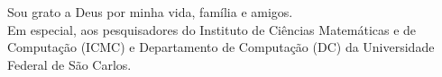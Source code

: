 Sou grato a Deus por minha vida, família e amigos. \\
Em especial, aos pesquisadores do Instituto de Ciências Matemáticas e de Computação (ICMC) e Departamento de Computação (DC) da Universidade Federal de São Carlos.
